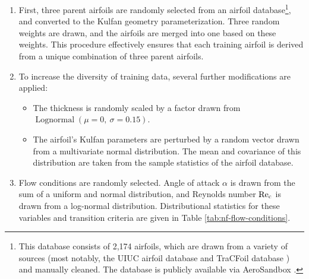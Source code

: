 \begin{enumerate}
    \item First, three parent airfoils are randomly selected from an airfoil database\footnote{This database consists of 2,174 airfoils, which are drawn from a variety of sources (most notably, the UIUC airfoil database \cite{uiuc_airfoil_database} and TraCFoil database \cite{etiemble_tracfoil_2023}) and manually cleaned. The database is publicly available via AeroSandbox \cite{sharpe_aerosandbox_2021}.}, and converted to the Kulfan geometry parameterization. Three random weights are drawn, and the airfoils are merged into one based on these weights. This procedure effectively ensures that each training airfoil is derived from a unique combination of three parent airfoils.
    \item To increase the diversity of training data, several further modifications are applied:
    \begin{itemize}
        \item The thickness is randomly scaled by a factor drawn from $\operatorname{Lognormal}(\mu=0,\ \sigma=0.15)$.
        \item The airfoil's Kulfan parameters are perturbed by a random vector drawn from a multivariate normal distribution. The mean and covariance of this distribution are taken from the sample statistics of the airfoil database.
    \end{itemize}
    \item Flow conditions are randomly selected. Angle of attack $\alpha$ is drawn from the sum of a uniform and normal distribution, and Reynolds number $\rm Re_c$ is drawn from a log-normal distribution. Distributional statistics for these variables and transition criteria are given in Table \ref{tab:nf-flow-conditions}.
\end{enumerate}

